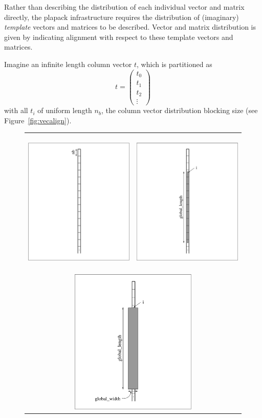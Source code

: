 Rather than describing the distribution of each individual
vector and matrix directly, the plapack infrastructure requires
the distribution of (imaginary) {\em template} vectors and matrices to
be described. Vector and matrix distribution is
given by indicating alignment with respect to these template vectors and matrices.

Imagine an infinite length column vector $ t $, which is partitioned as
\[
t = \left( \begin{array}{c}
t_0 \\ \hline
t_1 \\ \hline
t_2 \\ \hline
\vdots
\end{array}
\right)
\]
with all $ t_i $ of uniform length $ n_b $, the column vector
distribution blocking size (see Figure~\ref{fig:vecalign}).
\begin{figure}[htbp]
\begin{center}
\begin{tabular}{ c c }
\includegraphics[height=2.75in,width=2.75in]{figures/vecttemp.eps} 
&
\includegraphics[height=2.75in,width=2.75in]{figures/vectalign.eps} 
\\
\multicolumn{2}{c}{
\includegraphics[height=2.75in,width=2.75in]{figures/mvectalign.eps}
}
\end{tabular}
\end{center}
\end{figure}
